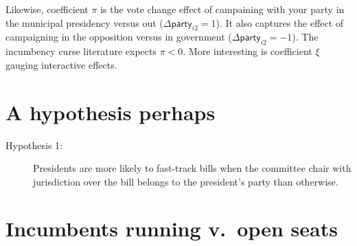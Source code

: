 \documentclass[letter,12pt]{article}
\newcommand{\vn}[1]{\vnform{#1}}      %
\newcommand{\vnform}[1]{\mathsf{#1}}  %
\begin{document}
Likewise, coefficient $\pi$ is the vote change effect of campaining with your party in the municipal presidency versus out ($\Delta \vn{party}_{i2}=1$). It also captures the effect of campaigning in the opposition versus in government ($\Delta \vn{party}_{i2}=-1$). The incumbency curse literature \citep{lucardi.rosas.Incumbency.2016,folkle.snyderGubMidtermSlump.2012} expects $\pi < 0$. More interesting is coefficient $\xi$ gauging interactive effects.  









\section{A hypothesis perhaps}

\begin{description}
  \item [Hypothesis 1:] Presidents are more likely to fast-track bills when the committee chair with jurisdiction over the bill  belongs to the president's party than otherwise.
\end{description}

\section{Incumbents running v.\ open seats}
\end{document}
